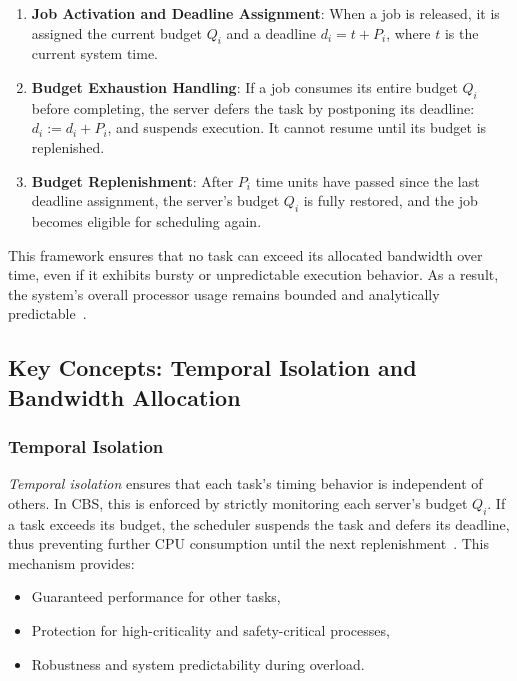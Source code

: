 \documentclass[conference]{IEEEtran}
\begin{document}
\begin{enumerate}
    \item \textbf{Job Activation and Deadline Assignment}: When a job is released, it is assigned the current budget \( Q_i \) and a deadline \( d_i = t + P_i \), where \( t \) is the current system time.
    \item \textbf{Budget Exhaustion Handling}: If a job consumes its entire budget \( Q_i \) before completing, the server defers the task by postponing its deadline: \( d_i := d_i + P_i \), and suspends execution. It cannot resume until its budget is replenished.
    \item \textbf{Budget Replenishment}: After \( P_i \) time units have passed since the last deadline assignment, the server's budget \( Q_i \) is fully restored, and the job becomes eligible for scheduling again.
\end{enumerate}

This framework ensures that no task can exceed its allocated bandwidth over time, even if it exhibits bursty or unpredictable execution behavior. As a result, the system’s overall processor usage remains bounded and analytically predictable~\cite{buttazzo2011hard}.

\subsection{Key Concepts: Temporal Isolation and Bandwidth Allocation}

\subsubsection{Temporal Isolation}

\textit{Temporal isolation} ensures that each task’s timing behavior is independent of others. In CBS, this is enforced by strictly monitoring each server’s budget \( Q_i \). If a task exceeds its budget, the scheduler suspends the task and defers its deadline, thus preventing further CPU consumption until the next replenishment~\cite{abeni1998integrating}. This mechanism provides:

\begin{itemize}
    \item Guaranteed performance for other tasks,
    \item Protection for high-criticality and safety-critical processes,
    \item Robustness and system predictability during overload.
\end{itemize}
\end{document}
